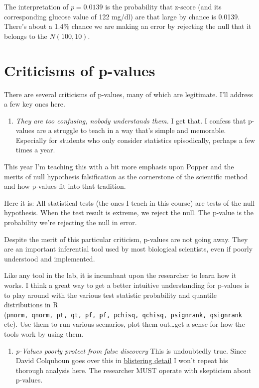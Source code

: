 \documentclass[]{book}
\providecommand{\tightlist}{%
  \setlength{\itemsep}{0pt}\setlength{\parskip}{0pt}}
\begin{document}
The interpretation of \(p=0.0139\) is the probability that z-score (and its corresponding glucose value of 122 mg/dl) are that large by chance is 0.0139. There's about a 1.4\% chance we are making an error by rejecting the null that it belongs to the \(N(100, 10)\).

\hypertarget{criticisms-of-p-values}{%
\section{Criticisms of p-values}\label{criticisms-of-p-values}}

There are several criticisms of p-values, many of which are legitimate. I'll address a few key ones here.

\begin{enumerate}
\def\labelenumi{\arabic{enumi}.}
\tightlist
\item
  \emph{They are too confusing, nobody understands them.}
  I get that. I confess that p-values are a struggle to teach in a way that's simple and memorable. Especially for students who only consider statistics episodically, perhaps a few times a year.
\end{enumerate}

This year I'm teaching this with a bit more emphasis upon Popper and the merits of null hypothesis falsification as the cornerstone of the scientific method and how p-values fit into that tradition.

Here it is: All statistical tests (the ones I teach in this course) are tests of the null hypothesis. When the test result is extreme, we reject the null. The p-value is the probability we're rejecting the null in error.

Despite the merit of this particular criticism, p-values are not going away. They are an important inferential tool used by most biological scientists, even if poorly understood and implemented.

Like any tool in the lab, it is incumbant upon the researcher to learn how it works. I think a great way to get a better intuitive understanding for p-values is to play around with the various test statistic probability and quantile distributions in R (\texttt{pnorm,\ qnorm,\ pt,\ qt,\ pf,\ pf,\ pchisq,\ qchisq,\ psignrank,\ qsignrank} etc). Use them to run various scenarios, plot them out\ldots{}get a sense for how the tools work by using them.

\begin{enumerate}
\def\labelenumi{\arabic{enumi}.}
\setcounter{enumi}{1}
\tightlist
\item
  \emph{p-Values poorly protect from false discovery}
  This is undoubtedly true. Since David Colquhoun goes over this in \href{http://rsos.royalsocietypublishing.org/content/1/3/140216}{blistering detail} I won't repeat his thorough analysis here. The researcher MUST operate with skepticism about p-values.
\end{enumerate}
\end{document}
